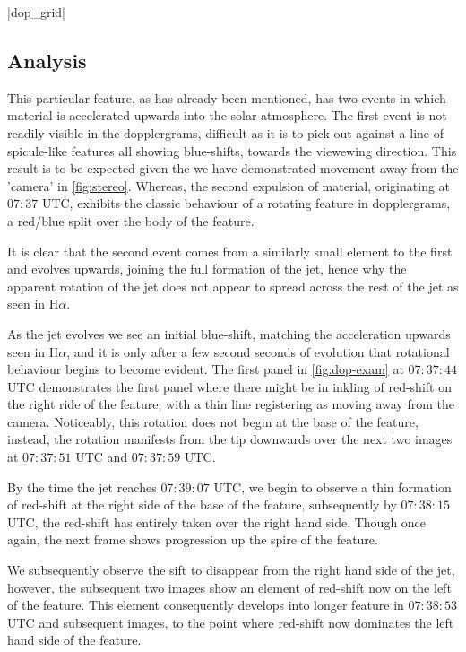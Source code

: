 \py[chapter5]|dop_grid|


\subsection{Analysis}
This particular feature, as has already been mentioned, has two events in which material is accelerated upwards into the solar atmosphere.
The first event is not readily visible in the dopplergrams, difficult as it is to pick out against a line of spicule-like features all showing blue-shifts, towards the viewewing direction.
This result is to be expected given the we have demonstrated movement away from the 'camera' in \cref{fig:stereo}.
Whereas, the second expulsion of material, originating at $07:37$ UTC, exhibits the classic behaviour of a rotating feature in dopplergrams, a red/blue split over the body of the feature. 
 
It is clear that the second event comes from a similarly small element to the first and evolves upwards, joining the full formation of the jet, hence why the apparent rotation of the jet does not appear to spread across the rest of the jet as seen in H$\alpha$.

As the jet evolves we see an initial blue-shift, matching the acceleration upwards seen in H$\alpha$, and it is only after a few second seconds of evolution that rotational behaviour begins to become evident.
The first panel in \cref{fig:dop-exam} at $07:37:44$ UTC demonstrates the first panel where there might be in inkling of red-shift on the right ride of the feature, with a thin line registering as moving away from the camera.
Noticeably, this rotation does not begin at the base of the feature, instead, the rotation manifests from the tip downwards over the next two images at $07:37:51$ UTC and $07:37:59$ UTC.

By the time the jet reaches $07:39:07$ UTC, we begin to observe a thin formation of red-shift at the right side of the base of the feature, subsequently by $07:38:15$ UTC, the red-shift has entirely taken over the right hand side.
Though once again, the next frame shows progression up the spire of the feature.

We subsequently observe the sift to disappear from the right hand side of the jet, however, the subsequent two images show an element of red-shift now on the left of the feature.
This element consequently develops into longer feature in $07:38:53$ UTC and subsequent images, to the point where red-shift now dominates the left hand side of the feature.

